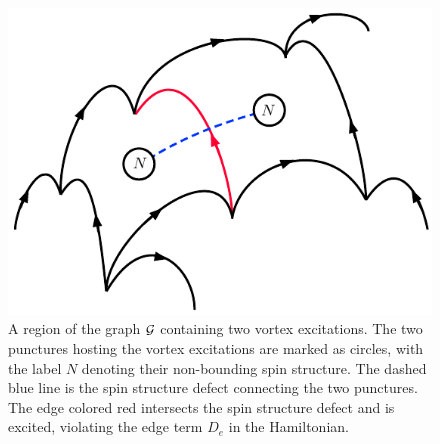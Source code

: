 \begin{figure}
\begin{center}
\includegraphics{graph_with_edge_excitation.pdf}
\caption{\label{lattice_w_vortices} A region of the graph $\mathcal{G}$ containing two vortex excitations. 
The two punctures hosting the vortex excitations are marked as circles, with the label $N$ denoting their non-bounding spin structure. 
The dashed blue line is the spin structure defect connecting the two punctures.
The edge colored red intersects the spin structure defect and is excited, violating the edge term $D_e$ in the Hamiltonian. 
}
\end{center}
\end{figure}

